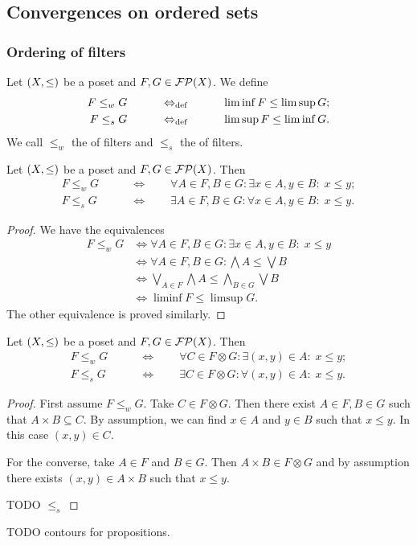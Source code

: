 \subsection{Convergences on ordered sets}
\subsubsection{Ordering of filters}
\begin{definition}
Let $\left( X,\leq \right)$ be a poset and $F,G\in\operatorname{\mathcal{FP}}(X)$. We define
\begin{align*}
F \leq_w G \qquad&\quad\Leftrightarrow_{\text{def}}\quad\qquad \liminf F \leq \limsup G; \\
F \leq_s G \qquad&\quad\Leftrightarrow_{\text{def}}\quad\qquad \limsup F \leq \liminf G.
\end{align*}
We call $\leq_w$ the  of filters and $\leq_s$ the  of filters.
\end{definition}

\begin{lemma} \label{filterInequalityCriterion}
Let $\left( X,\leq \right)$ be a poset and $F,G\in\operatorname{\mathcal{FP}}(X)$. Then
\begin{align*}
F \leq_w G \qquad &\iff\qquad \forall A\in F, B\in G: \exists x\in A, y\in B: \; x \leq y; \\
F \leq_s G \qquad &\iff\qquad \exists A\in F, B\in G: \forall x\in A, y\in B: \; x \leq y.
\end{align*}
\end{lemma}
\begin{proof}
We have the equivalences
\begin{align*}
F \leq_w G &\iff \forall A\in F, B\in G: \exists x\in A, y\in B: \; x \leq y \\
&\iff \forall A\in F, B\in G: \bigwedge A \leq \bigvee B \\
&\iff \bigvee_{A\in F}\bigwedge A \leq \bigwedge_{B\in G}\bigvee B \\
&\iff \liminf F \leq \limsup G.
\end{align*}
The other equivalence is proved similarly.
\end{proof}

\begin{lemma}
Let $\left( X,\leq \right)$ be a poset and $F,G\in\operatorname{\mathcal{FP}}(X)$. Then
\begin{align*}
F \leq_w G \qquad &\iff\qquad \forall C\in F\otimes G: \exists (x,y) \in A: \; x \leq y; \\
F \leq_s G \qquad &\iff\qquad \exists C\in F\otimes G: \forall (x,y) \in A: \; x \leq y.
\end{align*}
\end{lemma}
\begin{proof}
First assume $F\leq_w G$. Take $C\in F\otimes G$. Then there exist $A\in F, B\in G$ such that $A\times B \subseteq C$. By assumption, we can find $x\in A$ and $y\in B$ such that $x\leq y$. In this case $(x,y)\in C$.

For the converse, take $A\in F$ and $B\in G$. Then $A\times B\in F\otimes G$ and by assumption there exists $(x,y)\in A\times B$ such that $x\leq y$.

TODO $\leq_s$
\end{proof}
TODO contours for propositions.


